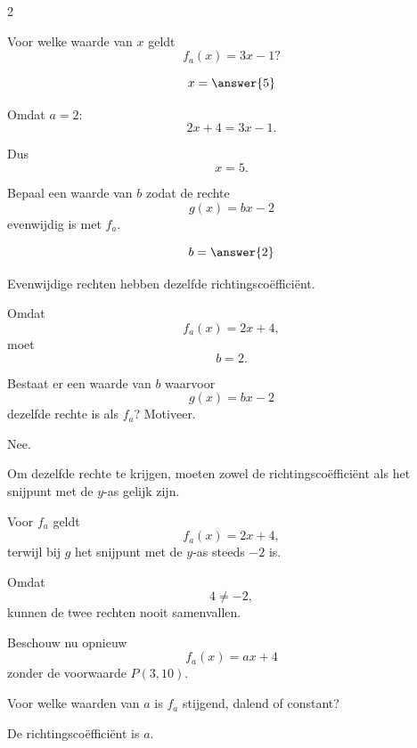 \documentclass{ximera}
\begin{document}
\begin{oefening}{\oefG}
\begin{multicols}{2}
    
    \begin{question}
    Voor welke waarde van $x$ geldt
    \[
    f_a(x)=3x-1?
    \]
    
    \[
    x=\answer{5}
    \]
    
    \begin{oplossing}
    Omdat $a=2$:
    \[
    2x+4=3x-1.
    \]
    
    Dus
    \[
    x=5.
    \]
    \end{oplossing}
    \end{question}
    
    
    \begin{question}
    Bepaal een waarde van $b$ zodat de rechte
    \[
    g(x)=bx-2
    \]
    evenwijdig is met $f_a$.
    
    \[
    b=\answer{2}
    \]
    
    \begin{oplossing}
    Evenwijdige rechten hebben dezelfde richtingscoëfficiënt.
    
    Omdat
    \[
    f_a(x)=2x+4,
    \]
    moet
    \[
    b=2.
    \]
    \end{oplossing}
    \end{question}
    
    
    \begin{question}
    Bestaat er een waarde van $b$ waarvoor
    \[
    g(x)=bx-2
    \]
    dezelfde rechte is als $f_a$? Motiveer.
    
    \begin{oplossing}
    Nee.
    
    Om dezelfde rechte te krijgen, moeten zowel de richtingscoëfficiënt als het snijpunt met de $y$-as gelijk zijn.
    
    Voor $f_a$ geldt
    \[
    f_a(x)=2x+4,
    \]
    terwijl bij $g$ het snijpunt met de $y$-as steeds $-2$ is.
    
    Omdat
    \[
    4\neq-2,
    \]
    kunnen de twee rechten nooit samenvallen.
    \end{oplossing}
    \end{question}
    
    
    \begin{question}
    Beschouw nu opnieuw
    \[
    f_a(x)=ax+4
    \]
    zonder de voorwaarde $P(3,10)$.
    
    Voor welke waarden van $a$ is $f_a$ stijgend, dalend of constant?
    
    \begin{oplossing}
    De richtingscoëfficiënt is $a$.
    

\end{oplossing}
\end{question}
\end{multicols}
\end{oefening}
\end{document}
